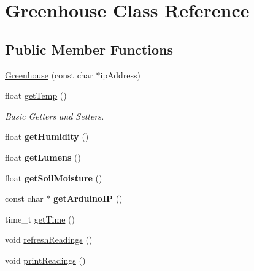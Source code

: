 \hypertarget{class_greenhouse}{\section{Greenhouse Class Reference}
\label{class_greenhouse}
}
\subsection*{Public Member Functions}
\begin{DoxyCompactItemize}
\item 
\hyperlink{class_greenhouse_a6dcdd0b121f595658ad940889bb71568}{Greenhouse} (const char $\ast$ip\-Address)
\item 
\hypertarget{class_greenhouse_a36f284cef2c401a413d375797acea2e4}{float \hyperlink{class_greenhouse_a36f284cef2c401a413d375797acea2e4}{get\-Temp} ()}\label{class_greenhouse_a36f284cef2c401a413d375797acea2e4}

\begin{DoxyCompactList}\small\item\em Basic Getters and Setters. \end{DoxyCompactList}\item 
\hypertarget{class_greenhouse_af039c7831ed0d1ddeab953427bf24042}{float {\bfseries get\-Humidity} ()}\label{class_greenhouse_af039c7831ed0d1ddeab953427bf24042}

\item 
\hypertarget{class_greenhouse_a1d990abc994a1a0ddefdd471f23bf9f7}{float {\bfseries get\-Lumens} ()}\label{class_greenhouse_a1d990abc994a1a0ddefdd471f23bf9f7}

\item 
\hypertarget{class_greenhouse_ab11820e184cec465180017475c338fd0}{float {\bfseries get\-Soil\-Moisture} ()}\label{class_greenhouse_ab11820e184cec465180017475c338fd0}

\item 
\hypertarget{class_greenhouse_aeb001843f081621fe9312df10abada69}{const char $\ast$ {\bfseries get\-Arduino\-I\-P} ()}\label{class_greenhouse_aeb001843f081621fe9312df10abada69}

\item 
time\-\_\-t \hyperlink{class_greenhouse_ab847ce79997377cafc8bffb97f84023b}{get\-Time} ()
\item 
void \hyperlink{class_greenhouse_a9f13f23ccb8435a5a21e61ac9380dcf4}{refresh\-Readings} ()
\item 
void \hyperlink{class_greenhouse_acc7fec4c8d6d478723e916fbc3971a3d}{print\-Readings} ()
\end{DoxyCompactItemize}


